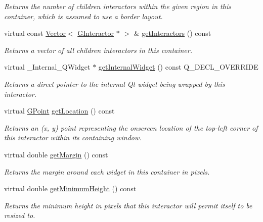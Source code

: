 \begin{DoxyCompactItemize}
\begin{DoxyCompactList}\small\item\em Returns the number of children interactors within the given region in this container, which is assumed to use a border layout. \end{DoxyCompactList}\item 
virtual const \mbox{\hyperlink{classVector}{Vector}}$<$ \mbox{\hyperlink{classGInteractor}{G\+Interactor}} $\ast$ $>$ \& \mbox{\hyperlink{classGContainer_a3f9ba3028f69581c7de79c9c03f39a2e}{get\+Interactors}} () const
\begin{DoxyCompactList}\small\item\em Returns a vector of all children interactors in this container. \end{DoxyCompactList}\item 
virtual \+\_\+\+Internal\+\_\+\+Q\+Widget $\ast$ \mbox{\hyperlink{classGContainer_a208ce13c1da40bf0ddb509daf99d6588}{get\+Internal\+Widget}} () const Q\+\_\+\+D\+E\+C\+L\+\_\+\+O\+V\+E\+R\+R\+I\+DE
\begin{DoxyCompactList}\small\item\em Returns a direct pointer to the internal Qt widget being wrapped by this interactor. \end{DoxyCompactList}\item 
virtual \mbox{\hyperlink{classGPoint}{G\+Point}} \mbox{\hyperlink{classGInteractor_a4f83802015511edeb63b892830812c11}{get\+Location}} () const
\begin{DoxyCompactList}\small\item\em Returns an (x, y) point representing the onscreen location of the top-\/left corner of this interactor within its containing window. \end{DoxyCompactList}\item 
virtual double \mbox{\hyperlink{classGContainer_ae2b63e249b9251e1893dae87aaf4cc3d}{get\+Margin}} () const
\begin{DoxyCompactList}\small\item\em Returns the margin around each widget in this container in pixels. \end{DoxyCompactList}\item 
virtual double \mbox{\hyperlink{classGInteractor_aed4b0075fcc434499c3cb3e46896bda3}{get\+Minimum\+Height}} () const
\begin{DoxyCompactList}\small\item\em Returns the minimum height in pixels that this interactor will permit itself to be resized to. \end{DoxyCompactList}\item 

\end{DoxyCompactItemize}
